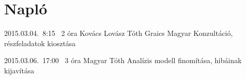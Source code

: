 %
\pagebreak
\section{Napló}

\begin{naplo}

\bejegyzes
{2015.03.04.~8:15~} %
{2 óra} %
{Kovács\newline
Lovász\newline
Tóth\newline
Graics\newline
Magyar
} %
{Konzultáció, részfeladatok kiosztása}

\bejegyzes
{2015.03.06.~17:00~}
{3 óra}
{Magyar\newline
Tóth}
{Analízis modell finomítása, hibáinak kijavítása}


\end{naplo}

